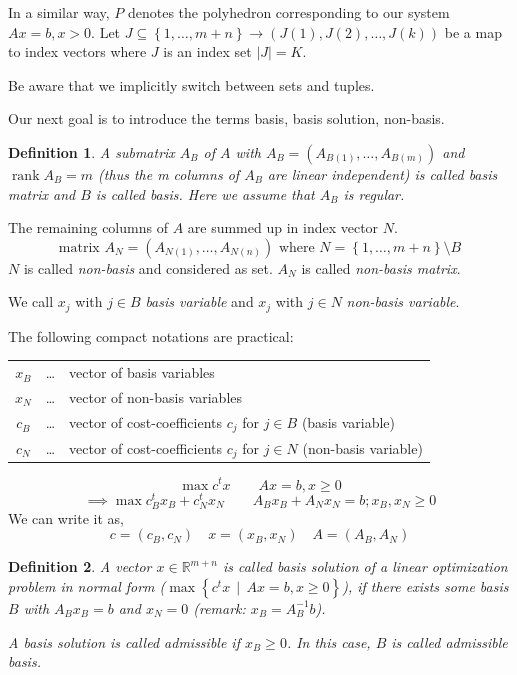 \documentclass[a4paper]{article}
\numberwithin{lecref}{section}
\newtheorem*{Definition}{Definition}
\newcommand{\Abs}[1]{\left|#1\right|}
\newcommand{\Set}[1]{\left\{#1\right\}}
\newcommand{\SetDef}[2]{\left\{#1\,\mid\,#2\right\}}
\DeclareMathOperator{\rank}{rank}
\begin{document}
In a similar way, $P$ denotes the polyhedron corresponding to our system $Ax = b, x > 0$.
Let $J \subseteq \Set{1, \dots, m+n} \to (J(1), J(2), \dots, J(k))$ be a map to index vectors where $J$ is an index set $\Abs{J} = K$.

Be aware that we implicitly switch between sets and tuples.

Our next goal is to introduce the terms basis, basis solution, non-basis.

\begin{Definition}
  A submatrix $A_B$ of $A$ with $A_{B} = (A_{B(1)}, \dots, A_{B(m)})$ and $\rank{A_B} = m$ (thus the m columns of $A_B$ are linear independent)
  is called \emph{basis matrix} and $B$ is called \emph{basis}. Here we assume that $A_B$ is regular.
\end{Definition}

The remaining columns of $A$ are summed up in index vector $N$.
\[ \text{matrix } A_N = (A_{N(1)}, \dots, A_{N(n)}) \text{ where } N = \Set{1, \dots, m+n} \setminus B \]
$N$ is called \emph{non-basis} and considered as set. $A_N$ is called \emph{non-basis matrix}.

We call $x_j$ with $j \in B$ \emph{basis variable} and $x_j$ with $j \in N$ \emph{non-basis variable}.

The following compact notations are practical: \\
\begin{tabular}{ccl}
	$x_B$ & \dots & vector of basis variables \\
	$x_N$ & \dots & vector of non-basis variables \\
	$c_B$ & \dots & vector of cost-coefficients $c_j$ for $j \in B$ (basis variable) \\
	$c_N$ & \dots & vector of cost-coefficients $c_j$ for $j \in N$ (non-basis variable)
\end{tabular}
\[ \max c^t x \qquad Ax = b, x \geq 0 \]
\[ \implies \max c_B^t x_B + c_N^t x_N \qquad A_B x_B + A_N x_N = b; x_B, x_N \geq 0 \]
We can write it as,
\[ c = (c_B, c_N) \quad x = (x_B, x_N) \quad A = (A_B, A_N) \]

\begin{Definition}
  A vector $x \in \mathbb R^{m + n}$ is called \emph{basis solution} of a linear optimization problem in normal form ($\max\SetDef{c^t x}{Ax = b, x \geq 0}$), if there exists some basis $B$ with $A_B x_B = b$ and $x_N = 0$ (remark: $x_B = A_B^{-1} b$).

  A basis solution is called \emph{admissible} if $x_B \geq 0$. In this case, $B$ is called \emph{admissible basis}.
\end{Definition}
\end{document}
